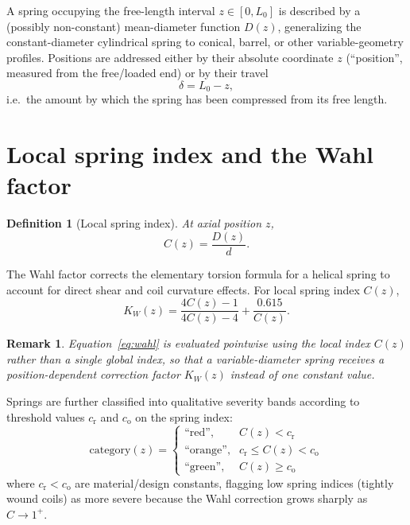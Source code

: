 \documentclass[11pt]{article}
\newtheorem{definition}{Definition}
\newtheorem{remark}{Remark}
\begin{document}
A spring occupying the free-length interval $z\in[0,L_0]$ is described by
a (possibly non-constant) mean-diameter function $D(z)$, generalizing the
constant-diameter cylindrical spring to conical, barrel, or other
variable-geometry profiles. Positions are addressed either by their
absolute coordinate $z$ (``position'', measured from the free/loaded end)
or by their travel
\begin{equation}
\delta = L_0 - z ,
\label{eq:travel}
\end{equation}
i.e.\ the amount by which the spring has been compressed from its free
length.

\section{Local spring index and the Wahl factor}

\begin{definition}[Local spring index]
At axial position $z$,
\begin{equation}
C(z) = \frac{D(z)}{d}.
\end{equation}
\end{definition}

The Wahl factor corrects the elementary torsion formula for a helical
spring to account for direct shear and coil curvature effects. For local
spring index $C(z)$,
\begin{equation}
K_W(z) = \frac{4C(z)-1}{4C(z)-4} + \frac{0.615}{C(z)} .
\label{eq:wahl}
\end{equation}

\begin{remark}
Equation~\eqref{eq:wahl} is evaluated pointwise using the \emph{local}
index $C(z)$ rather than a single global index, so that a
variable-diameter spring receives a position-dependent correction factor
$K_W(z)$ instead of one constant value.
\end{remark}

Springs are further classified into qualitative severity bands according
to threshold values $c_{\mathrm{r}} $ and $c_{\mathrm{o}}$ on the spring
index:
\begin{equation}
\text{category}(z) =
\begin{cases}
\text{``red''}, & C(z) < c_{\mathrm r} \\[2pt]
\text{``orange''}, & c_{\mathrm r} \le C(z) < c_{\mathrm o} \\[2pt]
\text{``green''}, & C(z) \ge c_{\mathrm o}
\end{cases}
\end{equation}
where $c_{\mathrm r} < c_{\mathrm o}$ are material/design constants,
flagging low spring indices (tightly wound coils) as more severe because
the Wahl correction grows sharply as $C\to 1^{+}$.
\end{document}
